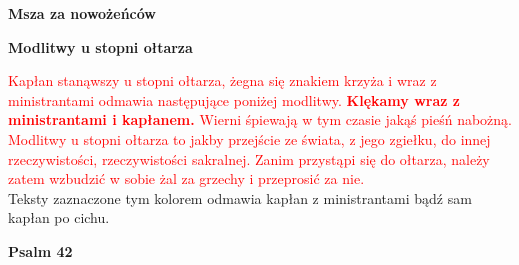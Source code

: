 
\begin{center}
\Large

\textbf{Msza za nowożeńców}\\[0.3cm] 

\normalsize
\end{center}

\begin{center}
\large
\textbf{Modlitwy u stopni ołtarza}
\normalsize

\textcolor{red}{Kapłan stanąwszy u stopni ołtarza, żegna się znakiem krzyża i wraz z ministrantami odmawia następujące poniżej modlitwy. \textbf{Klękamy wraz z ministrantami i kapłanem.} Wierni śpiewają w tym czasie jakąś pieśń nabożną. Modlitwy u stopni ołtarza to jakby przejście ze świata, z jego zgiełku, do innej rzeczywistości, rzeczywistości sakralnej. Zanim przystąpi się do ołtarza, należy zatem wzbudzić w sobie żal za grzechy i przeprosić za nie.}\\
\textcolor{my-color}{ Teksty zaznaczone tym kolorem odmawia kapłan z ministrantami bądź sam kapłan po cichu. }

\textbf{Psalm 42}
\end{center}

